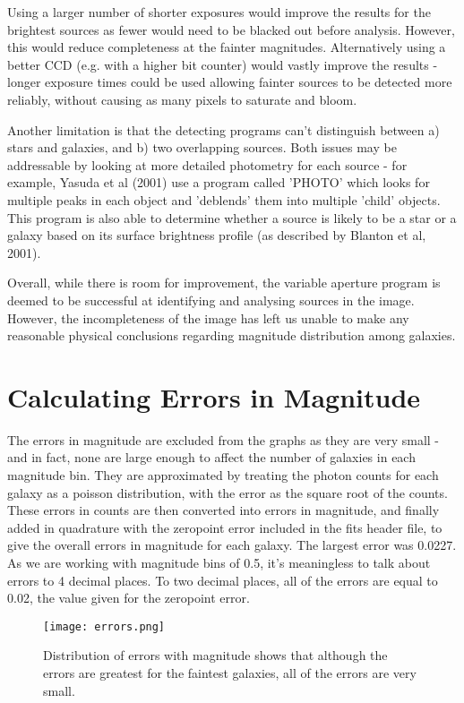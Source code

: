\documentclass[a4paper,11pt,twoside]{article}
\begin{document}
Using a larger number of shorter exposures would improve 
the results for the brightest sources as fewer would need 
to be blacked out before analysis. However, this would reduce 
completeness at the fainter magnitudes.
Alternatively using a better CCD (e.g. with a higher bit counter) 
would vastly improve the results - longer exposure times 
could be used allowing fainter sources to be detected more 
reliably, without causing as many pixels to saturate and 
bloom.

Another limitation is that the detecting programs can't distinguish 
between a) stars and galaxies, and b) two overlapping sources. 
Both issues may be addressable by looking at more detailed photometry 
for each source - for example, Yasuda et al (2001)\cite{yasuda} use a 
program called 'PHOTO' which looks for multiple peaks in each object 
and 'deblends' them into multiple 'child' objects. This program is also 
able to determine whether a source is likely to be a star or 
a galaxy based on its surface brightness profile 
(as described by Blanton et al, 2001\cite{blanton}).

Overall, while there is room for improvement, the variable 
aperture program is deemed to be successful at identifying
and analysing sources in the image. However, the incompleteness 
of the image has left us unable to make any reasonable physical 
conclusions regarding magnitude distribution among galaxies.

\appendix

\section{Calculating Errors in Magnitude}

The errors in magnitude are excluded from the graphs as they are very small - and in fact, none are large enough to affect the number of galaxies in each magnitude bin. 
They are approximated by treating the photon counts for each galaxy as a poisson distribution, with the error as the square root of the counts. These errors in counts are then converted into errors in magnitude, and finally added in quadrature with the zeropoint error included in the fits header file, to give the overall errors in magnitude for each galaxy. The largest error was 0.0227. As we are working with magnitude bins of 0.5, it's meaningless to talk about errors to 4 decimal places. To two decimal places, all of the errors are equal to 0.02, the value given for the zeropoint error. 

\begin{figure}[htb]
  \centering
  \texttt{[image: errors.png]}
  \caption{Distribution of errors with magnitude shows that although 
the errors are greatest for the faintest galaxies, 
all of the errors are very small.}
  \label{fig:errors}
\end{figure}
\end{document}
